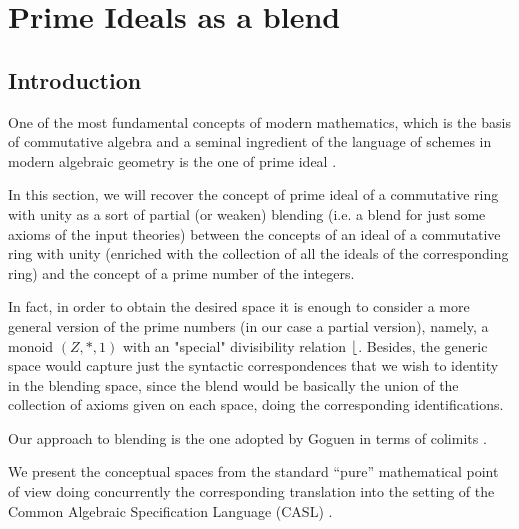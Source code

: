 \section{Prime Ideals as a blend}
\label{sec:prime_ideals}

\subsection*{Introduction}
One of the most fundamental concepts of modern mathematics, which is
the basis of commutative algebra and a seminal ingredient of the
language of schemes in modern algebraic geometry is the one of prime
ideal \parencite{EGAI,Eisenbud95}.

In this section, we will recover the concept of prime ideal of a
commutative ring with unity as a sort of partial (or weaken) blending
(i.e. a blend for just some axioms of the input theories) between the
concepts of an ideal of a commutative ring with unity (enriched with
the collection of all the ideals of the corresponding ring) and the
concept of a prime number of the integers.

In fact, in order to obtain the desired space it is enough to consider
a more general version of the prime numbers (in our case a partial
version), namely, a monoid $(Z,*,1)$ with an "special" divisibility
relation $\lfloor$. Besides, the generic space would capture just
the syntactic correspondences that we wish to identity in the
blending space, since the blend would be basically the union of the
collection of axioms given on each space, doing the corresponding
identifications.

Our approach to blending is the one adopted by Goguen in terms of
colimits  \parencite{Gog99,Goguen01,Goguen05c}.

We present the conceptual spaces from the standard ``pure''
mathematical point of view doing concurrently the corresponding
translation into the setting of the Common Algebraic Specification
Language (CASL) \cite{BidoitMosses2004}.
